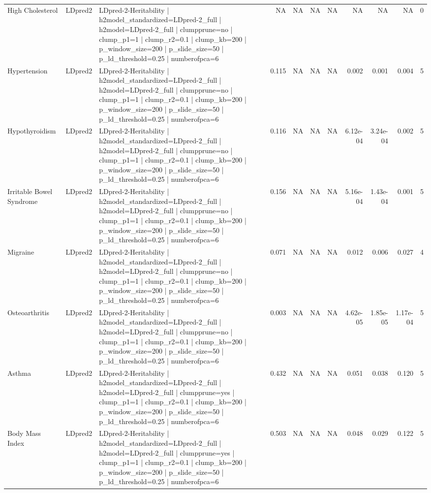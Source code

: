 \begin{landscape}
\begin{longtable}{p{2.4cm}p{1.8cm}p{6.0cm}rrrrrrrr}
High Cholesterol & LDpred2 & LDpred-2-Heritability | h2model\_standardized=LDpred-2\_full | h2model=LDpred-2\_full | clumpprune=no | clump\_p1=1 | clump\_r2=0.1 | clump\_kb=200 | p\_window\_size=200 | p\_slide\_size=50 | p\_ld\_threshold=0.25 | numberofpca=6 & NA & NA & NA & NA & NA & NA & NA & 0 \\
Hypertension & LDpred2 & LDpred-2-Heritability | h2model\_standardized=LDpred-2\_full | h2model=LDpred-2\_full | clumpprune=no | clump\_p1=1 | clump\_r2=0.1 | clump\_kb=200 | p\_window\_size=200 | p\_slide\_size=50 | p\_ld\_threshold=0.25 | numberofpca=6 & 0.115 & NA & NA & NA & 0.002 & 0.001 & 0.004 & 5 \\
Hypothyroidism & LDpred2 & LDpred-2-Heritability | h2model\_standardized=LDpred-2\_full | h2model=LDpred-2\_full | clumpprune=no | clump\_p1=1 | clump\_r2=0.1 | clump\_kb=200 | p\_window\_size=200 | p\_slide\_size=50 | p\_ld\_threshold=0.25 | numberofpca=6 & 0.116 & NA & NA & NA & 6.12e-04 & 3.24e-04 & 0.002 & 5 \\
Irritable Bowel Syndrome & LDpred2 & LDpred-2-Heritability | h2model\_standardized=LDpred-2\_full | h2model=LDpred-2\_full | clumpprune=no | clump\_p1=1 | clump\_r2=0.1 | clump\_kb=200 | p\_window\_size=200 | p\_slide\_size=50 | p\_ld\_threshold=0.25 | numberofpca=6 & 0.156 & NA & NA & NA & 5.16e-04 & 1.43e-04 & 0.001 & 5 \\
Migraine & LDpred2 & LDpred-2-Heritability | h2model\_standardized=LDpred-2\_full | h2model=LDpred-2\_full | clumpprune=no | clump\_p1=1 | clump\_r2=0.1 | clump\_kb=200 | p\_window\_size=200 | p\_slide\_size=50 | p\_ld\_threshold=0.25 | numberofpca=6 & 0.071 & NA & NA & NA & 0.012 & 0.006 & 0.027 & 4 \\
Osteoarthritis & LDpred2 & LDpred-2-Heritability | h2model\_standardized=LDpred-2\_full | h2model=LDpred-2\_full | clumpprune=no | clump\_p1=1 | clump\_r2=0.1 | clump\_kb=200 | p\_window\_size=200 | p\_slide\_size=50 | p\_ld\_threshold=0.25 | numberofpca=6 & 0.003 & NA & NA & NA & 4.62e-05 & 1.85e-05 & 1.17e-04 & 5 \\
Asthma & LDpred2 & LDpred-2-Heritability | h2model\_standardized=LDpred-2\_full | h2model=LDpred-2\_full | clumpprune=yes | clump\_p1=1 | clump\_r2=0.1 | clump\_kb=200 | p\_window\_size=200 | p\_slide\_size=50 | p\_ld\_threshold=0.25 | numberofpca=6 & 0.432 & NA & NA & NA & 0.051 & 0.038 & 0.120 & 5 \\
Body Mass Index & LDpred2 & LDpred-2-Heritability | h2model\_standardized=LDpred-2\_full | h2model=LDpred-2\_full | clumpprune=yes | clump\_p1=1 | clump\_r2=0.1 | clump\_kb=200 | p\_window\_size=200 | p\_slide\_size=50 | p\_ld\_threshold=0.25 | numberofpca=6 & 0.503 & NA & NA & NA & 0.048 & 0.029 & 0.122 & 5 \\

\end{longtable}
\end{landscape}
